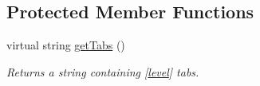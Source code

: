 \subsection*{Protected Member Functions}
\begin{DoxyCompactItemize}
\item 
virtual string \hyperlink{class_a_rdev_kit_1_1_model_1_1_project_1_1_file_1_1_abstract_block_a851f696a88ce274c5f20e1c4bcbdef4c}{get\-Tabs} ()
\begin{DoxyCompactList}\small\item\em Returns a string containing \mbox{[}\hyperlink{class_a_rdev_kit_1_1_model_1_1_project_1_1_file_1_1_abstract_block_a7c07abfe27f2f9104fe7c3d23c7333a5}{level}\mbox{]} tabs. \end{DoxyCompactList}\end{DoxyCompactItemize}
